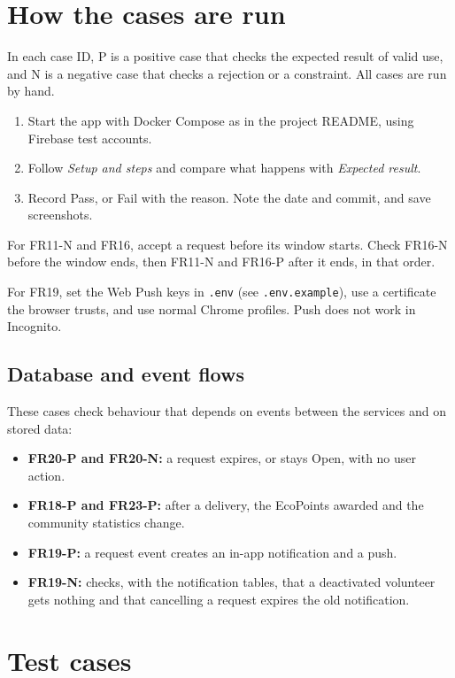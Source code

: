 \documentclass[11pt]{article}
\newcommand{\code}[1]{\texttt{#1}}
\begin{document}
\section{How the cases are run}

In each case ID, P is a positive case that checks the expected result of valid use, and N is a negative case that checks a rejection or a constraint. All cases are run by hand.

\begin{enumerate}[itemsep=2pt]
  \item Start the app with Docker Compose as in the project README, using Firebase test accounts.
  \item Follow \emph{Setup and steps} and compare what happens with \emph{Expected result}.
  \item Record Pass, or Fail with the reason. Note the date and commit, and save screenshots.
\end{enumerate}

For FR11-N and FR16, accept a request before its window starts. Check FR16-N before the window ends, then FR11-N and FR16-P after it ends, in that order.

For FR19, set the Web Push keys in \code{.env} (see \code{.env.example}), use a certificate the browser trusts, and use normal Chrome profiles. Push does not work in Incognito.

\subsection*{Database and event flows}
These cases check behaviour that depends on events between the services and on stored data:
\begin{itemize}[itemsep=2pt]
  \item \textbf{FR20-P and FR20-N:} a request expires, or stays Open, with no user action.
  \item \textbf{FR18-P and FR23-P:} after a delivery, the EcoPoints awarded and the community statistics change.
  \item \textbf{FR19-P:} a request event creates an in-app notification and a push.
  \item \textbf{FR19-N:} checks, with the notification tables, that a deactivated volunteer gets nothing and that cancelling a request expires the old notification.
\end{itemize}

\clearpage
\section{Test cases}
\filbreak
\end{document}
